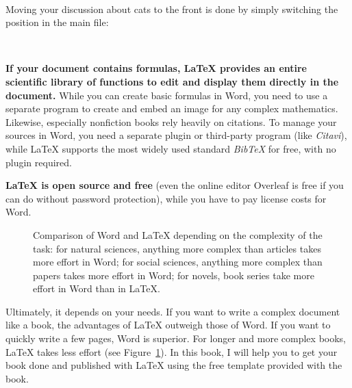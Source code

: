 \begin{lstlisting}


\end{lstlisting}

Moving your discussion about cats to the front is done by simply switching the position in the main file:

\begin{lstlisting}


\end{lstlisting}

\textbf{If your document contains formulas, LaTeX provides an entire scientific library of functions to edit and display them directly in the document.} While you can create basic formulas in Word, you need to use a separate program to create and embed an image for any complex mathematics. Likewise, especially nonfiction books rely heavily on citations. To manage your sources in Word, you need a separate plugin or third\hyp{}party program (like \textit{Citavi}), while LaTeX supports the most widely used standard \textit{BibTeX} for free, with no plugin required.



\textbf{LaTeX is open source and free} (even the online editor Overleaf is free if you can do without password protection), while you have to pay license costs for Word.

\begin{figure}[H]\centering

\caption{Comparison of Word and LaTeX depending on the complexity of the task: for natural sciences, anything more complex than articles takes more effort in Word; for social sciences, anything more complex than papers takes more effort in Word; for novels, book series take more effort in Word than in LaTeX.}
\label{latex-effort-writing-complexity:fig}
\end{figure}

Ultimately, it depends on your needs. If you want to write a complex document like a book, the advantages of LaTeX outweigh those of Word. If you want to quickly write a few pages, Word is superior. For longer and more complex books, LaTeX takes less effort (see Figure~\ref{latex-effort-writing-complexity:fig}). In this book, I will help you to get your book done and published with LaTeX using the free template provided with the book.

